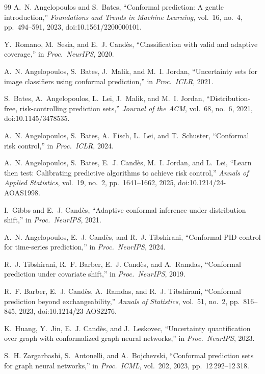 \documentclass{ieeeaccess}
\begin{document}
\begin{thebibliography}{99}
A.~N. Angelopoulos and S.~Bates,
``Conformal prediction: A gentle introduction,''
\emph{Foundations and Trends in Machine Learning}, vol.~16, no.~4,
pp.~494--591, 2023, doi:10.1561/2200000101.

Y.~Romano, M.~Sesia, and E.~J. Cand\`{e}s,
``Classification with valid and adaptive coverage,''
in \emph{Proc.\ NeurIPS}, 2020.

A.~N. Angelopoulos, S.~Bates, J.~Malik, and M.~I. Jordan,
``Uncertainty sets for image classifiers using conformal prediction,''
in \emph{Proc.\ ICLR}, 2021.

S.~Bates, A.~Angelopoulos, L.~Lei, J.~Malik, and M.~I. Jordan,
``Distribution-free, risk-controlling prediction sets,''
\emph{Journal of the ACM}, vol.~68, no.~6, 2021, doi:10.1145/3478535.

A.~N. Angelopoulos, S.~Bates, A.~Fisch, L.~Lei, and T.~Schuster,
``Conformal risk control,''
in \emph{Proc.\ ICLR}, 2024.

A.~N. Angelopoulos, S.~Bates, E.~J. Cand\`{e}s, M.~I. Jordan, and L.~Lei,
``Learn then test: Calibrating predictive algorithms to achieve risk
control,''
\emph{Annals of Applied Statistics}, vol.~19, no.~2, pp.~1641--1662, 2025,
doi:10.1214/24-AOAS1998.

I.~Gibbs and E.~J. Cand\`{e}s,
``Adaptive conformal inference under distribution shift,''
in \emph{Proc.\ NeurIPS}, 2021.

A.~N. Angelopoulos, E.~J. Cand\`{e}s, and R.~J. Tibshirani,
``Conformal PID control for time-series prediction,''
in \emph{Proc.\ NeurIPS}, 2024.

R.~J. Tibshirani, R.~F. Barber, E.~J. Cand\`{e}s, and A.~Ramdas,
``Conformal prediction under covariate shift,''
in \emph{Proc.\ NeurIPS}, 2019.

R.~F. Barber, E.~J. Cand\`{e}s, A.~Ramdas, and R.~J. Tibshirani,
``Conformal prediction beyond exchangeability,''
\emph{Annals of Statistics}, vol.~51, no.~2, pp.~816--845, 2023,
doi:10.1214/23-AOS2276.

K.~Huang, Y.~Jin, E.~J. Cand\`{e}s, and J.~Leskovec,
``Uncertainty quantification over graph with conformalized graph neural
networks,''
in \emph{Proc.\ NeurIPS}, 2023.

S.~H. Zargarbashi, S.~Antonelli, and A.~Bojchevski,
``Conformal prediction sets for graph neural networks,''
in \emph{Proc.\ ICML}, vol.~202, 2023, pp.~12\,292--12\,318.


\end{thebibliography}
\end{document}
